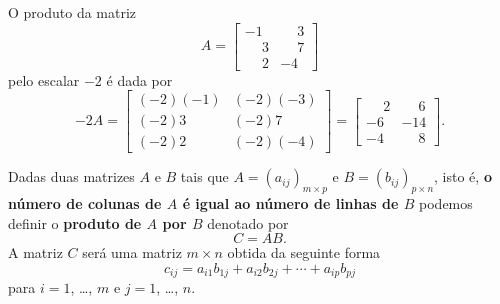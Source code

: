 \documentclass{beamer}
\begin{document}
  \begin{frame}
    \begin{exemplo}
      O produto da matriz
      \[A = \begin{bmatrix}
        -1 & \phantom{-}3\\
        \phantom{-}3 & \phantom{-}7\\
        \phantom{-}2 & -4
      \end{bmatrix}
      \]
      pelo escalar $-2$ é dada por
      \[
        -2A = \begin{bmatrix}
            (-2)(-1) & (-2)(-3)\\
            (-2)3 & (-2)7\\
            (-2)2 & (-2)(-4)
        \end{bmatrix} =
        \begin{bmatrix}
          \phantom{-}2 & \phantom{-}6\\
          -6 & -14\\
          -4 & \phantom{-}8
        \end{bmatrix}.
      \]
    \end{exemplo}
  \end{frame}

  \begin{frame}
    \begin{definicao}
      Dadas duas matrizes $A$ e $B$ tais que $A = (a_{ij})_{m \times p}$ e $B = (b_{ij})_{p \times n}$, isto é, 
      \textbf{o número de colunas de $A$ é igual ao número de linhas de $B$} podemos definir o \textbf{produto de $A$ por $B$}
      denotado por
      \[
        C = AB. 
      \]
      A matriz $C$ será uma matriz $m \times n$ obtida da seguinte forma 
      \begin{equation}\label{multiplicacao_de_matrizes}
        c_{ij} = a_{i1}b_{1j} + a_{i2}b_{2j} + \cdots + a_{ip}b_{pj}
      \end{equation}
      para $i = 1$, \dots, $m$ e $j = 1$, \dots, $n$.
    \end{definicao}
  \end{frame}
\end{document}

